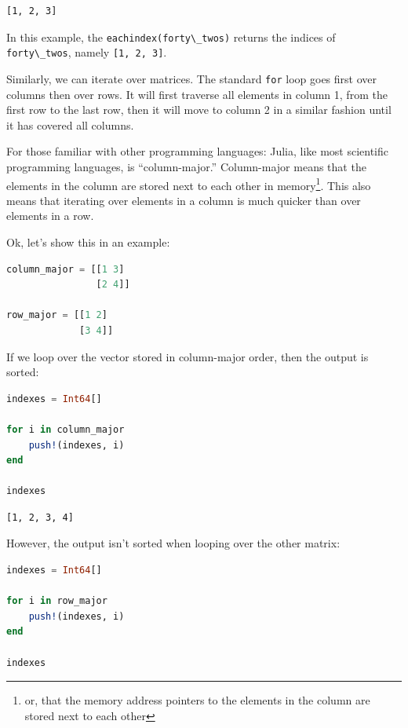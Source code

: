 \documentclass[
  notoc %
]{tufte-book}
\newcommand{\passthrough}[1]{#1}
\begin{document}
\begin{lstlisting}[language=Output]
[1, 2, 3]
\end{lstlisting}

In this example, the \passthrough{\lstinline!eachindex(forty\_twos)!}
returns the indices of \passthrough{\lstinline!forty\_twos!}, namely
\passthrough{\lstinline![1, 2, 3]!}.

Similarly, we can iterate over matrices. The standard
\passthrough{\lstinline!for!} loop goes first over columns then over
rows. It will first traverse all elements in column 1, from the first
row to the last row, then it will move to column 2 in a similar fashion
until it has covered all columns.

For those familiar with other programming languages: Julia, like most
scientific programming languages, is ``column-major.'' Column-major
means that the elements in the column are stored next to each other in
memory\footnote{or, that the memory address pointers to the elements in
  the column are stored next to each other}. This also means that
iterating over elements in a column is much quicker than over elements
in a row.

Ok, let's show this in an example:

\begin{lstlisting}[language=Julia]
column_major = [[1 3]
                [2 4]]

row_major = [[1 2]
             [3 4]]
\end{lstlisting}

If we loop over the vector stored in column-major order, then the output
is sorted:

\begin{lstlisting}[language=Julia]
indexes = Int64[]

for i in column_major
    push!(indexes, i)
end

indexes
\end{lstlisting}

\begin{lstlisting}[language=Output]
[1, 2, 3, 4]
\end{lstlisting}

However, the output isn't sorted when looping over the other matrix:

\begin{lstlisting}[language=Julia]
indexes = Int64[]

for i in row_major
    push!(indexes, i)
end

indexes
\end{lstlisting}
\end{document}

